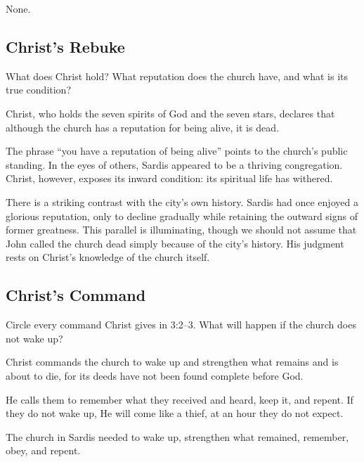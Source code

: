 None.

\subsection{Christ's Rebuke}

\begin{ScriptureBox2}{What does Christ hold? What reputation does the church have, and what is its true condition?}
\item[3:1] Christ, who holds the seven spirits of God and the seven stars, declares that although the church has a reputation for being alive, it is dead.
\end{ScriptureBox2}

The phrase ``you have a reputation of being alive'' points to the church's public standing. In the eyes of others, Sardis appeared to be a thriving congregation. Christ, however, exposes its inward condition: its spiritual life has withered.

There is a striking contrast with the city's own history. Sardis had once enjoyed a glorious reputation, only to decline gradually while retaining the outward signs of former greatness. This parallel is illuminating, though we should not assume that John called the church dead simply because of the city's history. His judgment rests on Christ's knowledge of the church itself.

\subsection{Christ's Command}

\begin{ScriptureBox2}{Circle every command Christ gives in 3:2--3. What will happen if the church does not wake up?}
\item[3:2] Christ commands the church to wake up and strengthen what remains and is about to die, for its deeds have not been found complete before God.

\item[3:3] He calls them to remember what they received and heard, keep it, and repent. If they do not wake up, He will come like a thief, at an hour they do not expect.
\end{ScriptureBox2}

The church in Sardis needed to wake up, strengthen what remained, remember, obey, and repent.

